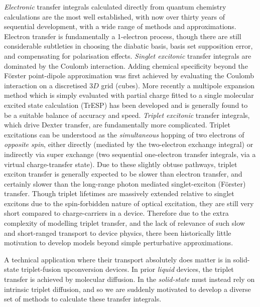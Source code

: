 \documentclass[aps,physrev,reprint,superscriptaddress,nofootinbib,amsmath,amssymb,a4paper]{revtex4-2}
\begin{document}
\emph{Electronic} transfer integrals calculated directly from quantum chemistry calculations are the most well established, with now over thirty years\cite{Cave1996} of sequential development\cite{Bredas2002}, with a wide range of methods and approximations. 
Electron transfer is fundamentally a 1-electron process, though there are still considerable subtleties in choosing the diabatic basis, basis set supposition error, and compensating for polarisation effects. 
\emph{Singlet excitonic} transfer integrals are dominated by the Coulomb interaction. 
Adding chemical specificity beyond the F\"orster point-dipole approximation was first achieved by evaluating the Coulomb interaction on a discretised $3D$ grid (cubes)\cite{Krueger1998}. 
More recently a multipole expansion method which is simply evaluated with partial charge fitted to a single molecular excited state calculation (TrESP) has been developed\cite{Madjet2006} and is generally found to be a suitable balance of accuracy and speed. 
\emph{Triplet excitonic} transfer integrals, which drive Dexter transfer, are fundamentally more complicated. 
Triplet excitations can be understood as the \emph{simultaneous} hopping of two electrons of \emph{opposite spin}, either directly (mediated by the two-electron exchange integral) or indirectly via super exchange (two sequential one-electron transfer integrals, via a virtual charge-transfer state). 
Due to these slightly obtuse pathways, triplet exciton transfer is generally expected to be slower than electron transfer, and certainly slower than the long-range photon mediated singlet-exciton (F\"orster) transfer. 
Though triplet lifetimes are massively extended relative to singlet excitons due to the spin-forbidden nature of optical excitation, they are still very short compared to charge-carriers in a device. 
Therefore due to the extra complexity of modelling triplet transfer, and the lack of relevance of such slow and short-ranged transport to device physics, there been historically little motivation to develop models beyond simple perturbative approximations. 

A technical application where their transport absolutely does matter is in solid-state triplet-fusion upconversion devices\cite{Izawa2021}. 
In prior \emph{liquid} devices, the triplet transfer is achieved by molecular diffusion. 
In the \emph{solid-state} must instead rely on intrinsic triplet diffusion, and so we are suddenly motivated to develop a diverse set of methods to calculate these transfer integrals. 

\end{document}
